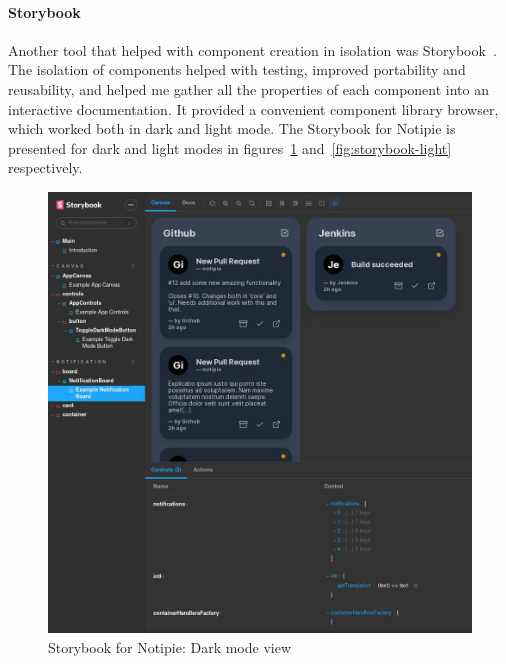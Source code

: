 \paragraph*{Storybook}\label{sec:storybook}

Another tool that helped with
component creation in isolation
was Storybook~\cite{shilman_storybook_2022}.
The isolation of components
helped with testing,
improved portability and reusability,
and helped me gather all the properties
of each component into an interactive
documentation.
It provided a convenient component library browser,
which worked both in dark and light mode.
The Storybook for Notipie is presented
for dark and light modes in
figures~\ref{fig:storybook-dark}
and~\ref{fig:storybook-light}
respectively.

\begin{figure}[hp]
  \centering
  \includegraphics[width=\linewidth,keepaspectratio]{img/storybook.jpg}
  \caption{Storybook for Notipie: Dark mode view}
  \label{fig:storybook-dark}
\end{figure}


